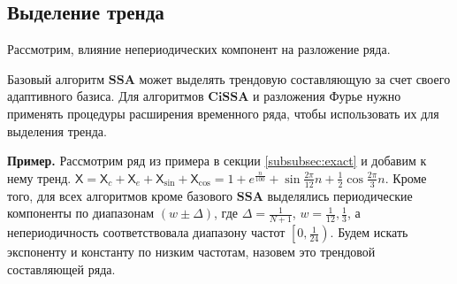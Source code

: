 \documentclass[a4paper, 11pt]{article}
\newcommand{\SSA}{\textbf{SSA}}
\newcommand{\CISSA}{\textbf{CiSSA}}
\newcommand{\TS}{\mathsf{X}}
\begin{document}
%
%
%


\subsection{Выделение тренда}

\label{subsubsec:trend}

Рассмотрим, влияние непериодических компонент на разложение ряда.

Базовый алгоритм $\SSA$ может выделять трендовую составляющую за счет своего адаптивного базиса. Для алгоритмов $\CISSA$ и разложения Фурье нужно применять процедуры расширения временного ряда, чтобы использовать их для выделения тренда.

\textbf{\large{Пример.}} Рассмотрим ряд из примера в секции \ref{subsubsec:exact} и добавим к нему тренд. $\TS = \TS_{c} + \TS_e + \TS_{\sin} + \TS_{\cos} = 1 + e^{\frac{n}{100}} + \sin{\frac{2\pi}{12}n} + \frac{1}{2}\cos{\frac{2\pi}{3}n}$.
Кроме того, для всех алгоритмов кроме базового $\SSA$ выделялись периодические компоненты по диапазонам $\left(w \pm \Delta \right)$, где $\Delta = \frac{1}{N+1}$, $w = \frac{1}{12}, \frac{1}{3}$, а непериодичность соответствовала диапазону частот $\left[0, \frac{1}{24} \right)$.
Будем искать экспоненту и константу по низким частотам, назовем это трендовой составляющей ряда.
\end{document}
